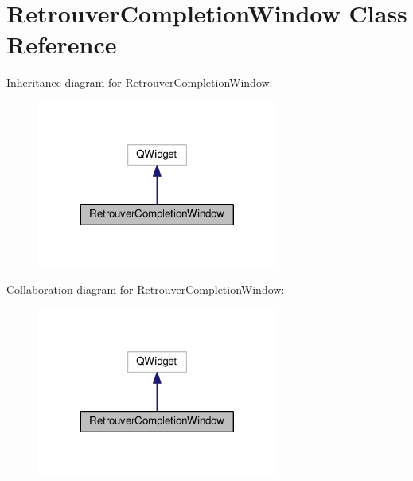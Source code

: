 \hypertarget{class_retrouver_completion_window}{\section{Retrouver\-Completion\-Window Class Reference}
\label{class_retrouver_completion_window}
}


Inheritance diagram for Retrouver\-Completion\-Window\-:
\nopagebreak
\begin{figure}[H]
\begin{center}
\leavevmode
\includegraphics[width=224pt]{class_retrouver_completion_window__inherit__graph}
\end{center}
\end{figure}


Collaboration diagram for Retrouver\-Completion\-Window\-:
\nopagebreak
\begin{figure}[H]
\begin{center}
\leavevmode
\includegraphics[width=224pt]{class_retrouver_completion_window__coll__graph}
\end{center}
\end{figure}
